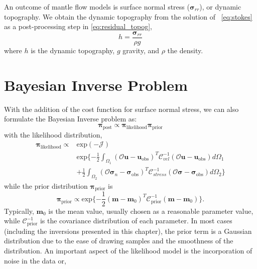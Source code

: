 \documentclass[12pt]{article}
\newcommand{\mm}{{\ensuremath{\boldsymbol{m}}}}
\newcommand{\uu}{{\ensuremath{\boldsymbol{u}}}}
\newcommand{\ppi}{{\ensuremath{\boldsymbol{\pi}}}}
\newcommand{\ssigma}{{\ensuremath{\boldsymbol{\sigma}}}}
\begin{document}
An outcome of mantle flow models is surface normal stress ($\ssigma_{rr}$), or dynamic topography. 
We obtain the dynamic topography from the solution of ~\eqref{eq:stokes} as a post-processing step in \eqref{eq:residual_topog},
\begin{equation}
h= \frac{\ssigma_{rr}}{\rho g}
\label{eq:residual_topog}
\end{equation}
where $h$ is the dynamic topography, $g$ gravity, and $\rho$ the density. 


 
\section*{Bayesian Inverse Problem}
With the addition of the cost function for surface normal stress, we can also formulate the Bayesian Inverse problem as:
\begin{equation}
\ppi_{\text{post}} \propto \ppi_{\text{likelihood}}\ppi_{\text{prior}}
\end{equation}
with the likelihood distribution,
\begin{equation}
\begin{split}
\ppi_{\text{likelihood}} \propto & \text{exp}(-\mathcal{J}) \\
                           & \text{exp}\{-\frac{1}{2}\int_{\Omega_1} (\mathcal{O}\uu-\uu_{\text{obs}})^T\mathcal{C}^{-1}_{vel}(\mathcal{O}\uu-\uu_{\text{obs}})d\Omega_1 \\
&+ \frac{1}{2}\int_{\Omega_2} (\mathcal{O}\ssigma_n-\ssigma_{\text{obs}})^T\mathcal{C}^{-1}_{stress}(\mathcal{O}\ssigma -\ssigma_{\text{obs}})d\Omega_2 \} 
\end{split}
\end{equation}
while the prior distribution $\ppi_{\text{prior}}$ is
\begin{equation}
\ppi_{\text{prior}}\propto \text{exp}\{-\frac{1}{2}(\mm-\mm_0)^T\mathcal{C}^{-1}_{\text{prior}}(\mm -\mm_0)\}. 
\end{equation}
Typically, $\mm_0$ is the mean value, usually chosen as a reasonable parameter value, while $\mathcal{C}^{-1}_{\text{prior}}$ is the covariance  distribution of each parameter. In most cases (including the inversions presented in this chapter), the prior term is a Gaussian distribution due to the ease of drawing samples and the smoothness of the distribution. An important aspect of the likelihood model is the incorporation of noise in the data or,
\end{document}
